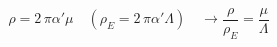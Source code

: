 \begin{equation}
\rho = 2\, \pi \alpha' \mu \quad (\rho_E = 2\, \pi \alpha' \Lambda)
\quad \rightarrow \frac{\rho}{\rho_E} = \frac{\mu}{\Lambda}
\label{idn2}
\end{equation}

